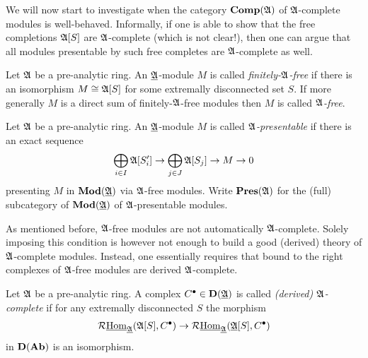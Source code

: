 We will now start to investigate when the category ${{\mathbf{Comp}}({\mathfrak{A}})}$ of ${\mathfrak{A}}$-complete modules is well-behaved. Informally, if one is able to show that the free completions ${{{\mathfrak{A}}[S]}}$ are ${\mathfrak{A}}$-complete (which is not clear!), then one can argue that all modules presentable by such free completes are ${\mathfrak{A}}$-complete as well. 
\begin{definition}
	Let ${\mathfrak{A}}$ be a pre-analytic ring. An ${\underline{{\mathfrak{A}}}}$-module $M$ is called \emph{finitely-${\mathfrak{A}}$-free} if there is an isomorphism $M\cong {{{\mathfrak{A}}[S]}}$ for some extremally disconnected set $S$. If more generally $M$ is a direct sum of finitely-${\mathfrak{A}}$-free modules then $M$ is called \emph{${\mathfrak{A}}$-free}.
\end{definition}

\begin{definition}
	Let ${\mathfrak{A}}$ be a pre-analytic ring. An ${\underline{{\mathfrak{A}}}}$-module $M$ is called \emph{${\mathfrak{A}}$-presentable} if there is an exact sequence
	$$\bigoplus_{i\in I} {{{\mathfrak{A}}[S'_i]}} \to \bigoplus_{j\in J} {{{\mathfrak{A}}[S_j]}}\to M\to 0$$
	presenting $M$ in ${{\mathbf{Mod}}({\underline{{\mathfrak{A}}}})}$ via ${\mathfrak{A}}$-free modules. Write ${{\mathbf{Pres}}({\mathfrak{A}})}$ for the (full) subcategory of ${{\mathbf{Mod}}({\underline{{\mathfrak{A}}}})}$ of ${\mathfrak{A}}$-presentable modules.
\end{definition}

As mentioned before, ${\mathfrak{A}}$-free modules are not automatically ${\mathfrak{A}}$-complete. Solely imposing this condition is however not enough to build a good (derived) theory of ${\mathfrak{A}}$-complete modules. Instead, one essentially requires that bound to the right complexes of ${\mathfrak{A}}$-free modules are derived ${\mathfrak{A}}$-complete.
\begin{definition}
	Let ${\mathfrak{A}}$ be a pre-analytic ring. A complex $C^\bullet \in {{\mathbf{D}}({\underline{{\mathfrak{A}}}})}$ is called \emph{(derived) ${\mathfrak{A}}$-complete} if for any extremally disconnected $S$ the morphism
		$$\mathcal{R}{\underline{\operatorname{Hom}}}_{\underline{{\mathfrak{A}}}}({{{\mathfrak{A}}[S]}}, C^\bullet) \to \mathcal{R}{\underline{\operatorname{Hom}}}_{\underline{{\mathfrak{A}}}}({{{\underline{{\mathfrak{A}}}}[S]}}, C^\bullet)$$
	in ${{\mathbf{D}}({{\mathbf{Ab}}})}$ is an isomorphism.
\end{definition}

